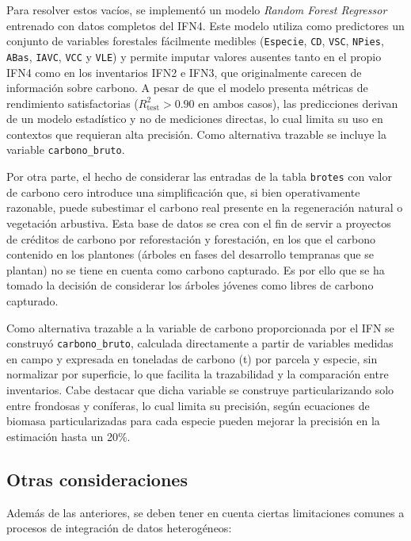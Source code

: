 Para resolver estos vacíos, se implementó un modelo \textit{Random Forest Regressor} entrenado con datos completos del IFN4. Este modelo utiliza como predictores un conjunto de variables forestales fácilmente medibles (\texttt{Especie}, \texttt{CD}, \texttt{VSC}, \texttt{NPies}, \texttt{ABas}, \texttt{IAVC}, \texttt{VCC} y \texttt{VLE}) y permite imputar valores ausentes tanto en el propio IFN4 como en los inventarios IFN2 e IFN3, que originalmente carecen de información sobre carbono. A pesar de que el modelo presenta métricas de rendimiento satisfactorias ($R^2_{\text{test}} > 0.90$ en ambos casos), las predicciones derivan de un modelo estadístico y no de mediciones directas, lo cual limita su uso en contextos que requieran alta precisión. Como alternativa trazable se incluye la variable \texttt{carbono\_bruto}.

\medskip

Por otra parte, el hecho de considerar las entradas de la tabla \texttt{brotes} con valor de carbono cero introduce una simplificación que, si bien operativamente razonable, puede subestimar el carbono real presente en la regeneración natural o vegetación arbustiva. Esta base de datos se crea con el fin de servir a proyectos de créditos de carbono por reforestación y forestación, en los que el carbono contenido en los plantones (árboles en fases del desarrollo tempranas que se plantan) no se tiene en cuenta como carbono capturado. Es por ello que se ha tomado la decisión de considerar los árboles jóvenes como libres de carbono capturado. 

\medskip

Como alternativa trazable a la variable de carbono proporcionada por el IFN se construyó \texttt{carbono\_bruto}, calculada directamente a partir de variables medidas en campo y expresada en toneladas de carbono (t) por parcela y especie, sin normalizar por superficie, lo que facilita la trazabilidad y la comparación entre inventarios. Cabe destacar que dicha variable se construye particularizando solo entre frondosas y coníferas, lo cual limita su precisión, según \cite{ruizpeinado2011} ecuaciones de biomasa particularizadas para cada especie pueden mejorar la precisión en la estimación hasta un 20\%. 

\subsection*{Otras consideraciones}

Además de las anteriores, se deben tener en cuenta ciertas limitaciones comunes a procesos de integración de datos heterogéneos:

